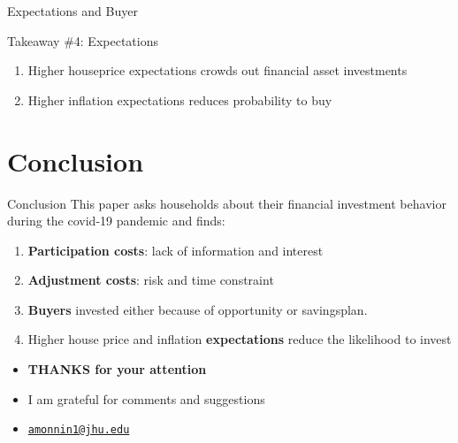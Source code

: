 \documentclass[pdflatex]{beamer}
\begin{document}
\begin{frame}{Expectations and Buyer}
	\begin{block}{Takeaway \#4: Expectations}
		{
			\begin{enumerate}
				\item Higher houseprice expectations crowds out financial asset investments
				\item Higher inflation expectations reduces probability to buy
			\end{enumerate}
		}
	\end{block}
\end{frame}

\section{Conclusion}
\begin{frame}{Conclusion}
	This paper asks households about their financial investment behavior during the covid-19 pandemic and finds:
	\vspace{1em}
	\begin{enumerate}
		\item \textbf{Participation costs}: lack of information and interest
		\item \textbf{Adjustment costs}: risk and time constraint
		\item \textbf{Buyers} invested either because of opportunity or savingsplan. 
		\item Higher house price and inflation \textbf{expectations} reduce the likelihood to invest
	\end{enumerate}
\end{frame}

\begin{frame}
	
	\begin{itemize}
		\item[] \textbf{THANKS for your attention}
		\bigskip
		\item[] I am grateful for comments and suggestions
		\smallskip
		\item[] \href{mailto:amonnin1@jhu.edu}{\texttt{amonnin1@jhu.edu} }
	\end{itemize}
	
\end{frame}
\end{document}
